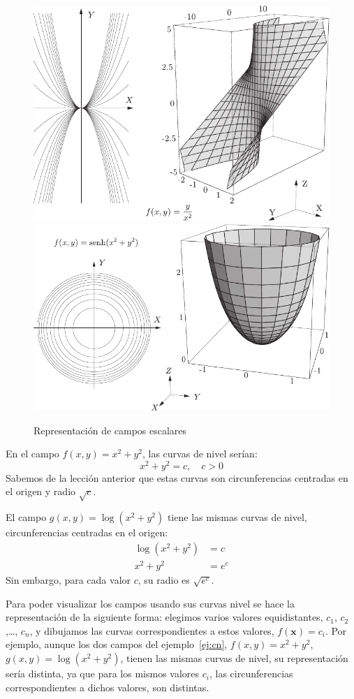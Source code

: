 \begin{figure}
\begin{center}
\includegraphics{T2/figs/nivel3.pdf}\\[5em]
\includegraphics{T2/figs/nivel4.pdf}
\end{center}
\caption{Representación de campos escalares}\label{fig-rep2}
\end{figure}
%
\begin{ejemplo}\label{ej:cn}
En el campo $f(x,y)=x^2+y^2$, las curvas de nivel serían:
\[
x^2+y^2=c,\quad c> 0
\]
Sabemos de la lección anterior que estas curvas son circunferencias centradas en el origen y radio
$\sqrt c$.

El campo $g(x,y)=\log(x^2+y^2)$ tiene las mismas curvas de nivel, circunferencias centradas en el origen:
\begin{align*}
\log(x^2+y^2) &= c\\
x^2+y^2 &=e^c
\end{align*}
Sin embargo, para cada valor $c$, su radio es $\sqrt{e^c}$.\fej
\end{ejemplo}
%
Para poder visualizar los campos usando sus curvas nivel se hace la representación de la siguiente forma:
elegimos varios valores equidistantes, $c_1$, $c_2$,\dots, $c_n$, y dibujamos las curvas correspondientes a estos valores, $f(\boldsymbol{x})=c_i$.
Por ejemplo, aunque los dos campos del ejemplo~\ref{ej:cn}, $f(x,y)=x^2+y^2$, $g(x,y)=\log(x^2+y^2)$, tienen las mismas curvas de nivel, su representación sería distinta, ya que para los mismos valores $c_i$, las circunferencias correspondientes a dichos valores, son distintas.

